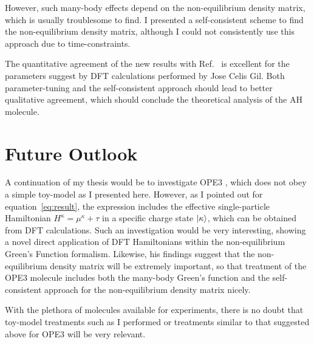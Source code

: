 However, such many-body effects depend on the non-equilibrium density matrix, which is usually troublesome to find. I presented a self-consistent scheme to find the non-equilibrium density matrix, although I could not consistently use this approach due to time-constraints. 

The quantitative agreement of the new results with Ref.~\cite{perrinnano} is excellent for the parameters suggest by DFT calculations performed by Jose Celis Gil.  Both parameter-tuning and the self-consistent approach should lead to better qualitative agreement, which should conclude the theoretical analysis of the AH molecule.

\section{Future Outlook}
\label{sec:outlook}
A continuation of my thesis would be to investigate OPE3 \cite{frisenda}, which does not obey a simple toy-model as I presented here. However, as I pointed out for equation~\ref{eq:result}, the expression includes the effective single-particle Hamiltonian $H^\kappa = \mu^\kappa + \tau$ in a specific charge state $\ket{\kappa}$, which can be obtained from DFT calculations. Such an investigation would be very interesting, showing a novel direct application of DFT Hamiltonians within the non-equilibrium Green's Function formalism. Likewise, his findings suggest that the non-equilibrium density matrix will be extremely important, so that treatment of the OPE3 molecule includes both the many-body Green's function and the self-consistent approach for the non-equilibrium density matrix nicely.

With the plethora of molecules available for experiments, there is no doubt that toy-model treatments such as I performed or treatments similar to that suggested above for OPE3 will be very relevant.


\clearpage
{}
